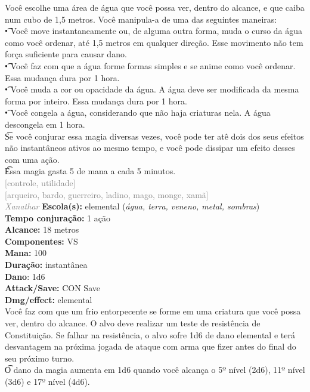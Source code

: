 \documentclass{RPG_Adventure}[2021/10/20]
\begin{document}
{\normalsize Você escolhe uma área de água que você possa ver, dentro do alcance, e que caiba num cubo de 1,5 metros. Você manipula-a de uma das seguintes maneiras:\\\t • Você move instantaneamente ou, de alguma outra forma, muda o curso da água como você ordenar, até 1,5 metros em qualquer direção. Esse movimento não tem força suficiente para causar dano.\\\t • Você faz com que a água forme formas simples e se anime como você ordenar. Essa mudança dura por 1 hora.\\\t • Você muda a cor ou opacidade da água. A água deve ser modificada da mesma forma por inteiro. Essa mudança dura por 1 hora.\\\t • Você congela a água, considerando que não haja criaturas nela. A água descongela em 1 hora.\\\t Se você conjurar essa magia diversas vezes, você pode ter atê dois dos seus efeitos não instantâneos ativos ao mesmo tempo, e você pode dissipar um efeito desses com uma ação.\\\t Essa magia gasta 5 de mana a cada 5 minutos.\\}
{\scriptsize \textcolor{gray}{[controle, utilidade]\\}}
{\scriptsize \textcolor{gray}{[arqueiro, bardo, guerreiro, ladino, mago, monge, xamã]\\}}
{\tiny \textcolor{gray}{\textit{Xanathar}}}\jump{}
{\small \t \textbf{Escola(s):} elemental (\textit{água, terra, veneno, metal, sombras})\\\t \textbf{Tempo conjuração:} 1 ação\\\t \textbf{Alcance:} 18 metros\\\t \textbf{Componentes:} VS\\\t \textbf{Mana:} 100\\\t \textbf{Duração:} instantânea\\\t \textbf{Dano}: 1d6\\\t \textbf{Attack/Save:} CON Save\\\t \textbf{Dmg/effect:} elemental\\}
{\normalsize Você faz com que um frio entorpecente se forme em uma criatura que você possa ver, dentro do alcance. O alvo deve realizar um teste de resistência de Constituição. Se falhar na resistência, o alvo sofre 1d6 de dano elemental e terá desvantagem na próxima jogada de ataque com arma que fizer antes do final do seu próximo turno.\\\t O dano da magia aumenta em 1d6 quando você alcança o 5º nível (2d6), 11º nível (3d6) e 17º nível (4d6).\\}
\end{document}
